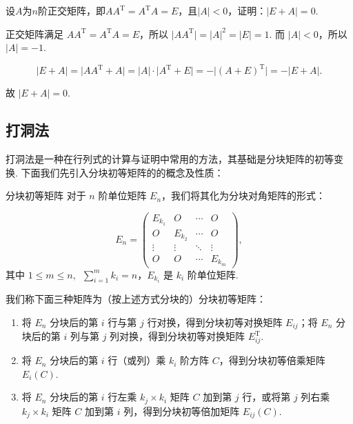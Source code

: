 \begin{example}{}{}
    设$A$为$n$阶正交矩阵，即$AA^\mathrm{T}=A^\mathrm{T}A=E$，且$|A|<0$，证明：$|E+A|=0$.
\end{example}

\begin{solution}
    正交矩阵满足 $AA^{\mathrm{T}} = A^{\mathrm{T}}A = E$，所以 $\lvert AA^{\mathrm{T}} \rvert = \lvert A \rvert^2 = \lvert E \rvert = 1$. 而 $\lvert A \rvert < 0$，所以 $\lvert A \rvert = -1$.

    \[
        \lvert E+A \rvert = \lvert AA^{\mathrm{T}}+A \rvert = \lvert A \rvert \cdot \lvert A^{\mathrm{T}}+E \rvert = -\lvert (A+E)^{\mathrm{T}} \rvert = -\lvert E+A \rvert.
    \]

    故 $\lvert E+A \rvert = 0$.
\end{solution}

\subsection{打洞法}

打洞法是一种在行列式的计算与证明中常用的方法，其基础是分块矩阵的初等变换. 下面我们先引入分块初等矩阵的的概念及性质：

\begin{definition}{}{分块初等矩阵}
    对于 $n$ 阶单位矩阵 $E_n$，我们将其化为分块对角矩阵的形式：

    \[
        E_n = \begin{pmatrix}
            E_{k_1} & O & \cdots & O \\
            O & E_{k_2} & \cdots & O \\
            \vdots & \vdots & \ddots & \vdots \\
            O & O & \cdots & E_{k_m}
        \end{pmatrix},
    \]
    其中 $1 \leqslant m \leqslant n, \enspace \sum\limits_{i=1}^m k_i = n$，$E_{k_i}$ 是 $k_i$ 阶单位矩阵.

    我们称下面三种矩阵为（按上述方式分块的）分块初等矩阵：

    \begin{enumerate}
        \item 将 $E_n$ 分块后的第 $i$ 行与第 $j$ 行对换，得到分块初等对换矩阵 $E_{ij}$；将 $E_n$ 分块后的第 $i$ 列与第 $j$ 列对换，得到分块初等对换矩阵 $E_{ij}^{\mathrm{T}}$.
        \item 将 $E_n$ 分块后的第 $i$ 行（或列）乘 $k_i$ 阶方阵 $C$，得到分块初等倍乘矩阵 $E_i(C)$.
        \item 将 $E_n$ 分块后的第 $i$ 行左乘 $k_j \times k_i$ 矩阵 $C$ 加到第 $j$ 行，或将第 $j$ 列右乘 $k_j \times k_i$ 矩阵 $C$ 加到第 $i$ 列，得到分块初等倍加矩阵 $E_{ij}(C)$.
    \end{enumerate}
\end{definition}

